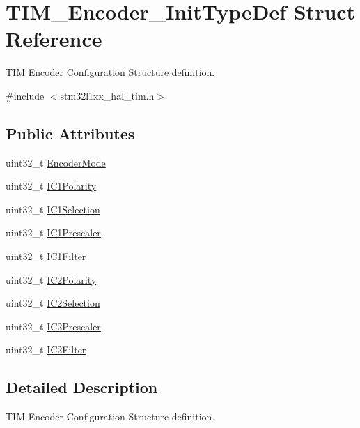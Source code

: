 \hypertarget{struct_t_i_m___encoder___init_type_def}{\section{T\-I\-M\-\_\-\-Encoder\-\_\-\-Init\-Type\-Def Struct Reference}
\label{struct_t_i_m___encoder___init_type_def}
}


T\-I\-M Encoder Configuration Structure definition.  




{\ttfamily \#include $<$stm32l1xx\-\_\-hal\-\_\-tim.\-h$>$}

\subsection*{Public Attributes}
\begin{DoxyCompactItemize}
\item 
uint32\-\_\-t \hyperlink{struct_t_i_m___encoder___init_type_def_ab1e4b0752d88c04081e3ff2fea6aa52e}{Encoder\-Mode}
\item 
uint32\-\_\-t \hyperlink{struct_t_i_m___encoder___init_type_def_a3e27323d593e4f3b95ebaa3772e79618}{I\-C1\-Polarity}
\item 
uint32\-\_\-t \hyperlink{struct_t_i_m___encoder___init_type_def_a85fbdebacff594ff1ad0d16eddfdc179}{I\-C1\-Selection}
\item 
uint32\-\_\-t \hyperlink{struct_t_i_m___encoder___init_type_def_a56307eb4766e3f0e1cd1cd3c4fc2157e}{I\-C1\-Prescaler}
\item 
uint32\-\_\-t \hyperlink{struct_t_i_m___encoder___init_type_def_a50f3051c1b568b9dcde146199f97f3fb}{I\-C1\-Filter}
\item 
uint32\-\_\-t \hyperlink{struct_t_i_m___encoder___init_type_def_abb7968a8ba34e13da1fb8f5916a754ce}{I\-C2\-Polarity}
\item 
uint32\-\_\-t \hyperlink{struct_t_i_m___encoder___init_type_def_a84a39a8667f296b4b3fbe1a0add58396}{I\-C2\-Selection}
\item 
uint32\-\_\-t \hyperlink{struct_t_i_m___encoder___init_type_def_ac80972d0e157508ff075815da58070cb}{I\-C2\-Prescaler}
\item 
uint32\-\_\-t \hyperlink{struct_t_i_m___encoder___init_type_def_a30cdb580735007aa9735b2f5cc133049}{I\-C2\-Filter}
\end{DoxyCompactItemize}


\subsection{Detailed Description}
T\-I\-M Encoder Configuration Structure definition. 

